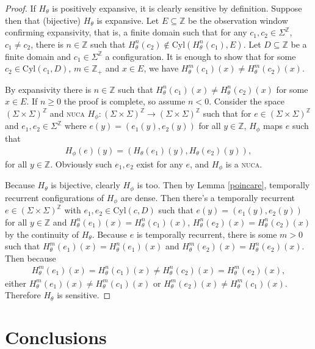 \documentclass[runningheads]{llncs}
\newcommand{\Z}{\mathbb{Z}}
\newcommand{\cyl}{\mathrm{Cyl}}
\begin{document}
\begin{proof}
If $H_\theta$ is positively expansive, it is clearly sensitive by definition. Suppose then that (bijective) $H_\theta$ is expansive. Let $E \subseteq \Z$ be the observation window confirming expansivity, that is, a finite domain such that for any $c_1,c_2\in \Sigma^\Z$, $c_1 \neq c_2$, there is $n\in \Z$ such that $H_\theta ^n (c_2) \notin \cyl (H_\theta ^n (c_1),E)$. Let $D\subseteq \Z$ be a finite domain and $c_1 \in \Sigma^\Z$ a configuration. It is enough to show that for some $c_2 \in \cyl (c_1,D)$, $m \in \Z_+$ and $x \in E$, we have $H_\theta^m (c_1)(x) \neq H_\theta^m (c_2)(x)$.

By expansivity there is $n\in \Z$ such that $H_\theta^n (c_1)(x) \neq H_\theta^n (c_2)(x)$ for some $x\in E$. If $n\geq 0$ the proof is complete, so assume $n<0$. Consider the space $(\Sigma \times \Sigma)^\Z$ and \textsc{nuca} $H_\phi:(\Sigma \times \Sigma)^\Z \rightarrow (\Sigma \times \Sigma)^\Z$ such that for $e \in (\Sigma \times \Sigma)^\Z$ and $e_1,e_2 \in \Sigma^\Z$ where $e(y) = (e_1(y),e_2(y))$ for all $y\in \Z$, $H_\phi$ maps $e$ such that
\begin{align*}
H_\phi(e)(y) = (H_\theta (e_1)(y),H_\theta (e_2)(y)),
\end{align*}
for all $y\in \Z$. Obviously such $e_1,e_2$ exist for any $e$, and $H_\phi$ is a \textsc{nuca}. 

Because $H_\theta$ is bijective, clearly $H_\phi$ is too. Then by Lemma \ref{poincare}, temporally recurrent configurations of $H_\phi$ are dense. Then there's a temporally recurrent $e \in (\Sigma \times \Sigma)^\Z$ with $e_1,e_2 \in \cyl (c, D)$ such that $e(y) = (e_1(y),e_2(y))$ for all $y \in \Z$ and $H_\theta^n (e_1)(x) = H_\theta^n (c_1)(x)$, $H_\theta^n (e_2)(x) = H_\theta^n (c_2)(x)$ by the continuity of $H_\theta$. Because $e$ is temporally recurrent, there is some $m>0$ such that $H_\theta^m (e_1)(x) = H_\theta^n (e_1)(x)$ and $H_\theta^m (e_2)(x) = H_\theta^n (e_2)(x)$. Then because 
\begin{align*}
H_\theta^m (e_1)(x) = H_\theta^n (c_1)(x) \neq H_\theta^n (c_2)(x) = H_\theta^m (e_2)(x),
\end{align*}
either $H_\theta^m (e_1)(x) \neq H_\theta^m (c_1)(x)$ or $H_\theta^m (e_2)(x) \neq H_\theta^m (c_1)(x)$. Therefore $H_\theta$ is sensitive.
\end{proof}

\section{Conclusions}
\end{document}
